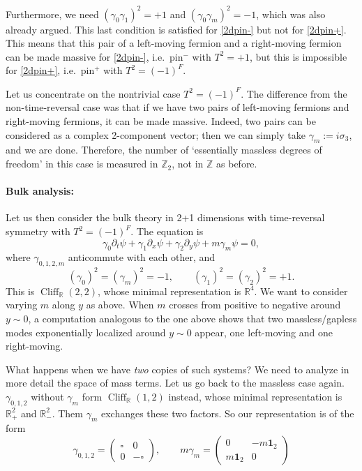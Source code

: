 \documentclass[12pt]{article}
\numberwithin{equation}{section}
\numberwithin{figure}{section}
\theoremstyle{remark}
\def\bR{\mathbb{R}}
\def\bZ{\mathbb{Z}}
\def\Cliff{\mathop{\mathrm{Cliff}}\nolimits}
\begin{document}
Furthermore, we need $(\gamma_0\gamma_1)^2=+1$ and $(\gamma_0\gamma_m)^2=-1$,
which was also already argued. 
This last condition is satisfied for \eqref{2dpin-} but not for \eqref{2dpin+}.
This means that this pair of a left-moving fermion and a right-moving fermion
can be made massive for \eqref{2dpin-}, i.e.~pin$^-$ with $T^2=+1$,
but this is impossible for \eqref{2dpin+}, i.e.~pin$^+$ with $T^2=(-1)^F$.

Let us concentrate on the nontrivial case $T^2=(-1)^F$.
The difference from the non-time-reversal case was that if we have two pairs of 
left-moving fermions and right-moving fermions, it can be made massive.
Indeed, two pairs  can be considered as a complex 2-component vector; then 
we can simply take $\gamma_m := i\sigma_3$, and we are done.
Therefore, the number of `essentially massless degrees of freedom' in this case 
is measured in $\bZ_2$, not in $\bZ$ as before.

\paragraph{Bulk analysis:}
Let us then consider the bulk theory in 2+1 dimensions with time-reversal symmetry with $T^2=(-1)^F$.
The equation is \begin{equation}
\gamma_0 \partial_t\psi +\gamma_1\partial_x\psi + \gamma_2\partial_y\psi + m\gamma_m \psi =0,
\label{2+1treq}
\end{equation}
where $\gamma_{0,1,2,m}$ anticommute with each other, and \begin{equation}
(\gamma_0)^2=(\gamma_m)^2=-1,\qquad (\gamma_1)^2=(\gamma_2)^2=+1.
\end{equation}
This is $\Cliff_\bR(2,2)$, whose minimal representation is $\bR^4$. 
We want to consider varying $m$ along $y$ as above.
When $m$ crosses from positive to negative around $y\sim 0$,
a computation analogous to the one above shows that two massless/gapless modes 
exponentially localized around $y\sim 0$ appear, one left-moving and one right-moving.

What happens when we have \emph{two} copies of such systems?
We need to analyze in more detail the space of mass terms. 
Let us go back to the massless case again.
$\gamma_{0,1,2}$ without $\gamma_m$ form $\Cliff_\bR(1,2)$ instead, whose minimal representation
is $\bR^2_+$ and $\bR^2_-$. 
Them $\gamma_m$ exchanges these two factors. 
So our representation is of the form \begin{equation}
\gamma_{0,1,2}=\begin{pmatrix}
\square & 0 \\
0 & -\square
\end{pmatrix}, \qquad
m \gamma_m=\begin{pmatrix}
0 & -m \mathbf{1}_2 \\
m \mathbf{1}_2 & 0
\end{pmatrix}
\end{equation}
\end{document}
